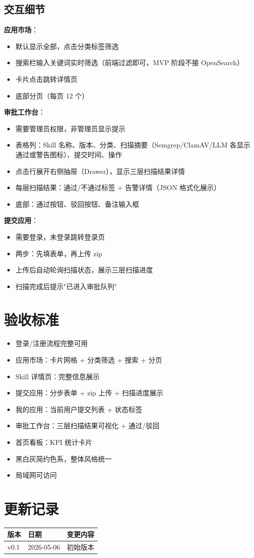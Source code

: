 \documentclass[11pt,a4paper]{article}
\begin{document}
\subsection{交互细节}

\textbf{应用市场}：
\begin{itemize}[nosep]
  \item 默认显示全部，点击分类标签筛选
  \item 搜索栏输入关键词实时筛选（前端过滤即可，MVP 阶段不接 OpenSearch）
  \item 卡片点击跳转详情页
  \item 底部分页（每页 12 个）
\end{itemize}

\textbf{审批工作台}：
\begin{itemize}[nosep]
  \item 需要管理员权限，非管理员显示提示
  \item 表格列：Skill 名称、版本、分类、扫描摘要（Semgrep/ClamAV/LLM 各显示通过或警告图标）、提交时间、操作
  \item 点击行展开右侧抽屉（Drawer），显示三层扫描结果详情
  \item 每层扫描结果：通过/不通过标签 + 告警详情（JSON 格式化展示）
  \item 底部：通过按钮、驳回按钮、备注输入框
\end{itemize}

\textbf{提交应用}：
\begin{itemize}[nosep]
  \item 需要登录，未登录跳转登录页
  \item 两步：先填表单，再上传 zip
  \item 上传后自动轮询扫描状态，展示三层扫描进度
  \item 扫描完成后提示"已进入审批队列"
\end{itemize}

\section{验收标准}

\begin{itemize}
  \item[$\square$] 登录/注册流程完整可用
  \item[$\square$] 应用市场：卡片网格 + 分类筛选 + 搜索 + 分页
  \item[$\square$] Skill 详情页：完整信息展示
  \item[$\square$] 提交应用：分步表单 + zip 上传 + 扫描进度展示
  \item[$\square$] 我的应用：当前用户提交列表 + 状态标签
  \item[$\square$] 审批工作台：三层扫描结果可视化 + 通过/驳回
  \item[$\square$] 首页看板：KPI 统计卡片
  \item[$\square$] 黑白灰简约色系，整体风格统一
  \item[$\square$] 局域网可访问
\end{itemize}

\section*{更新记录}

\begin{tabular}{lll}
\toprule
版本 & 日期 & 变更内容 \\
\midrule
v0.1 & 2026-05-06 & 初始版本 \\
\bottomrule
\end{tabular}
\end{document}
